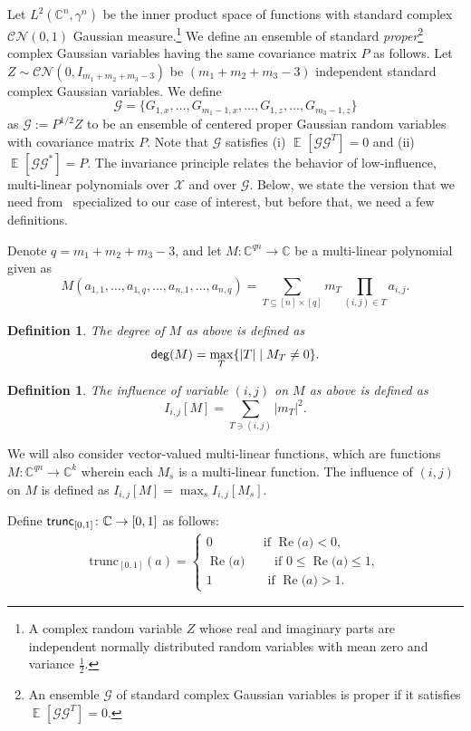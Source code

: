 \documentclass[10pt,a4paper]{amsart}
\newtheorem{definition}[thm]{Definition}
\newcommand\card[1]{\left| {#1} \right|}
\newcommand\Expect[2]{{\mathop{\mathbb{E}}_{#1}\left[ {#2} \right]}}
\renewcommand\leq{\leqslant}
\begin{document}
Let $L^2(\mathbb{C}^n, \gamma^n)$ be the inner product space of functions with standard complex $\mathcal{C}\mathcal{N}(0, 1)$ Gaussian measure.\footnote{A complex random variable $Z$ whose real and imaginary parts are independent normally distributed random variables with mean zero and variance $\frac{1}{2}$.} We define an ensemble of standard {\em proper}\footnote{An ensemble $\mathcal{G}$ of standard complex Gaussian variables is proper if it satisfies $\Expect{}{\mathcal{G}\mathcal{G}^T}=0$.} complex Gaussian variables having the same covariance matrix $P$ as follows.  Let $Z\sim \mathcal{C}\mathcal{N}(0, I_{m_1+m_2+m_3-3})$ be $(m_1+m_2+m_3-3)$ independent standard complex Gaussian variables. We define 
%
\[
\mathbf{\mathcal{G}} = \{G_{1,x},\ldots,G_{m_1-1, x},\ldots, G_{1,z},\ldots,G_{m_3-1, z}\}
\]
as $\mathcal{G}:= P^{1/2}Z$ to be an ensemble of centered proper Gaussian random variables with covariance matrix $P$. Note that $\mathcal{G}$ satisfies (i) $\Expect{}{\mathcal{G}\mathcal{G}^T}=0$ and (ii) $\Expect{}{\mathcal{G}\mathcal{G}^*}=P$. The invariance principle relates
the behavior of low-influence, multi-linear polynomials over $\mathcal{X}$ and over $\mathbf{\mathcal{G}}$. Below, we state
the version that we need from~\cite{Mossel} specialized to our case of interest, but before that, we need a few definitions.

Denote $q = m_1+m_2+m_3-3$, and let $M\colon \mathbb{C}^{q n}\to\mathbb{C}$ be a multi-linear polynomial given as
\[
M(a_{1,1},\ldots,a_{1,q},\ldots, a_{n,1},\ldots, a_{n,q})
=\sum\limits_{T\subseteq [n]\times [q]}m_T \prod\limits_{(i,j)\in T} a_{i,j}.
\]

\begin{definition}
	The degree of $M$ as above is defined as
	\[
	{\sf deg}(M) = \max_{T}\{ \card{T} \mid M_T \neq 0\}.
	\]
\end{definition}

\begin{definition}
	The influence of variable $(i,j)$ on $M$ as above is defined as
	\[
	I_{i,j}[M] = \sum\limits_{T\ni (i,j)}\card{m_T}^2.
	\]
\end{definition}
We will also consider vector-valued multi-linear functions, which are functions
$M\colon \mathbb{C}^{qn}\to\mathbb{C}^{k}$ wherein each $M_s$ is a multi-linear function.
The influence of $(i,j)$ on $M$ is defined as $I_{i,j}[M] = \max_{s}I_{i,j}[M_s]$.

Define ${\sf trunc}_{[0,1]}\colon\mathbb{C}\to [0,1]$ as follows:
%
\begin{align*}
	\mathrm{trunc}_{[0,1]}(a) =  \begin{cases}
		0 \qquad  \qquad \mbox{if $\operatorname{Re}$($a$)} < 0,\\
		\mbox{$\operatorname{Re}$($a$)} \qquad  \mbox{ if } 0 \leq \mbox{$\operatorname{Re}$($a$)} \leq 1,\\
		1  \qquad \qquad  \mbox{ if } \mbox{$\operatorname{Re}$($a$)} > 1.
	\end{cases}
\end{align*}
\end{document}
